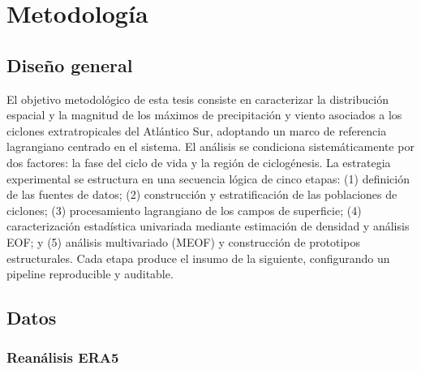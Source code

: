 \chapter{Metodología}\label{ch:metodologia}


\section{Diseño general}\label{sec:diseno_general}

El objetivo metodológico de esta tesis consiste en caracterizar la distribución espacial y la magnitud de los máximos de precipitación y viento asociados a los ciclones extratropicales del Atlántico Sur, adoptando un marco de referencia lagrangiano centrado en el sistema. El análisis se condiciona sistemáticamente por dos factores: la fase del ciclo de vida y la región de ciclogénesis. La estrategia experimental se estructura en una secuencia lógica de cinco etapas: (1) definición de las fuentes de datos; (2) construcción y estratificación de las poblaciones de ciclones; (3) procesamiento lagrangiano de los campos de superficie; (4) caracterización estadística univariada mediante estimación de densidad y análisis EOF; y (5) análisis multivariado (MEOF) y construcción de prototipos estructurales. Cada etapa produce el insumo de la siguiente, configurando un pipeline reproducible y auditable.


\section{Datos}\label{sec:datos}

\subsection{Reanálisis ERA5}\label{sec:datos_era5}

